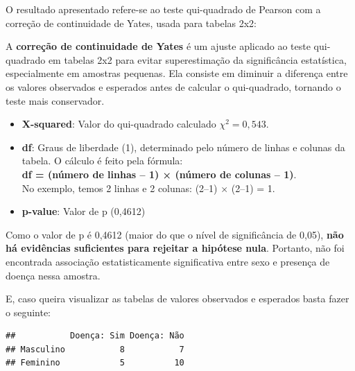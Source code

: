\documentclass[
]{book}
\newenvironment{Shaded}{\begin{snugshade}}{\end{snugshade}}
\newcommand{\CommentTok}[1]{\textcolor[rgb]{0.56,0.35,0.01}{\textit{#1}}}
\newcommand{\NormalTok}[1]{#1}
\newcommand{\SpecialCharTok}[1]{\textcolor[rgb]{0.81,0.36,0.00}{\textbf{#1}}}
\providecommand{\tightlist}{%
  \setlength{\itemsep}{0pt}\setlength{\parskip}{0pt}}
\begin{document}
O resultado apresentado refere-se ao teste qui-quadrado de Pearson com a correção de continuidade de Yates, usada para tabelas 2x2:

A \textbf{correção de continuidade de Yates} é um ajuste aplicado ao teste qui-quadrado em tabelas 2x2 para evitar superestimação da significância estatística, especialmente em amostras pequenas. Ela consiste em diminuir a diferença entre os valores observados e esperados antes de calcular o qui-quadrado, tornando o teste mais conservador.

\begin{itemize}
\tightlist
\item
  \textbf{X-squared}: Valor do qui-quadrado calculado \(\chi^2 = 0,543\).\\
\item
  \textbf{df}: Graus de liberdade (1), determinado pelo número de linhas e colunas da tabela. O cálculo é feito pela fórmula:\\
  \textbf{df = (número de linhas -- 1) × (número de colunas -- 1)}.\\
  No exemplo, temos 2 linhas e 2 colunas: (2--1) × (2--1) = 1.
\item
  \textbf{p-value}: Valor de p (0,4612)
\end{itemize}

Como o valor de p é 0,4612 (maior do que o nível de significância de 0,05), \textbf{não há evidências suficientes para rejeitar a hipótese nula}. Portanto, não foi encontrada associação estatisticamente significativa entre sexo e presença de doença nessa amostra.

E, caso queira visualizar as tabelas de valores observados e esperados basta fazer o seguinte:

\begin{Shaded}
\end{Shaded}

\begin{verbatim}
##           Doença: Sim Doença: Não
## Masculino           8           7
## Feminino            5          10
\end{verbatim}

\begin{Shaded}
\end{Shaded}
\end{document}
